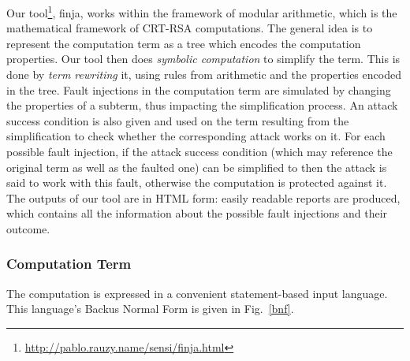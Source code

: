 \documentclass[10pt]{article}
\theoremstyle{definition}
\theoremstyle{theorem}
\newcommand{\finja}{\textsf{finja}\xspace}
\begin{document}
Our tool\footnote{\url{http://pablo.rauzy.name/sensi/finja.html}}, \finja, works within the framework of modular arithmetic, which is the mathematical framework of CRT-RSA computations.
The general idea is to represent the computation term as a tree which encodes the computation properties.
Our tool then does \emph{symbolic computation} to simplify the term.
This is done by \emph{term rewriting} it, using rules from arithmetic and the properties encoded in the tree.
Fault injections in the computation term are simulated by changing the properties of a subterm, thus impacting the simplification process.
An attack success condition is also given and used on the term resulting from the simplification to check whether the corresponding attack works on it.
For each possible fault injection, if the attack success condition (which may reference the original term as well as the faulted one) can be simplified to  then the attack is said to work with this fault, otherwise the computation is protected against it.
The outputs of our tool are in HTML form: easily readable reports are produced, which contains all the information about the possible fault injections and their outcome.

\subsubsection{Computation Term}
\label{finja-term}

The computation is expressed in a convenient statement-based input language.
This language's Backus Normal Form is given in Fig.~\ref{bnf}.
\end{document}
